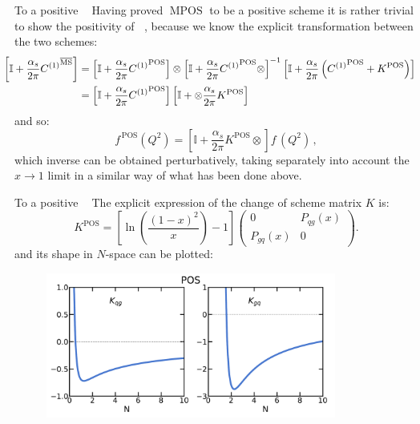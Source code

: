 \documentclass[9pt]{beamer}
\DeclareMathOperator{\msbar}{\overline{MS}}
\DeclareMathOperator{\pos}{POS}
\DeclareMathOperator{\mpos}{MPOS}
\begin{document}
\begin{frame}{To a positive $\msbar$}
    Having proved $\mpos$ to be a positive scheme it is rather trivial to show
    the positivity of $\msbar$, because we know the explicit transformation
    between the two schemes:
    \begin{align*}
        \hspace*{-12pt}\left[\mathbb{I}
        +\frac{\alpha_s}{2\pi} {C^{(1)}}^{\msbar}\right]&=\left[\mathbb{I}
          +\frac{\alpha_s}{2\pi} {C^{(1)}}^{\pos}\right]\otimes\left[\mathbb{I}
          +\frac{\alpha_s}{2\pi} {C^{(1)}}^{\pos}\otimes\right]^{-1}\left[\mathbb{I}
          +\frac{\alpha_s}{2\pi}  \left({C^{(1)}}^{\pos} +K^{\pos}\right)\right]\\  
        &=\left[\mathbb{I}
          +\frac{\alpha_s}{2\pi} {C^{(1)}}^{\pos}
          \right]\left[\mathbb{I}
          + \otimes \frac{\alpha_s}{2\pi}  K^{\pos}\right]
    \end{align*}
    and so:
    \begin{equation*}
     f^{\,\pos}(Q^2)=\left[\mathbb{I}
      +\frac{\alpha_s}{2\pi}  K^{\pos}\otimes\right] f^{\,\msbar}(Q^2)\,,
    \end{equation*}
    which inverse can be obtained perturbatively, taking separately into
    account the $x \to 1$ limit in a similar way of what has been done above.
\end{frame}

\begin{frame}{To a positive $\msbar$}
    The explicit expression of the change of scheme matrix $K$ is:
    \begin{equation*}
        K^{\pos}=\left[\ln\left(\frac{(1-x)^2}{x}\right) - 1\right]
        \left(\begin{array}{cc} 0 & P_{qg}(x) \\
        P_{gq}(x) & 0\end{array}\right).
    \end{equation*}
    and its shape in $N$-space can be plotted:
    \begin{figure}
      \includegraphics[width=0.85\textwidth]{pictures/kmatrix-offdiagonal-9}
    \end{figure}
\end{frame}
\end{document}
